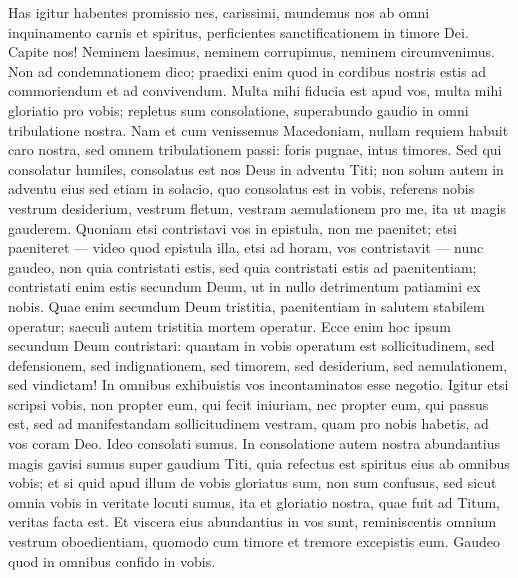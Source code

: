 \begin{biblechapter}  
\verse Has igitur habentes promissio nes, carissimi, mundemus nos ab omni inquinamento carnis et spiritus, perficientes sanctificationem in timore Dei. 
\verse Capite nos! Neminem laesimus, neminem corrupimus, neminem circumvenimus. 
\verse Non ad condemnationem dico; praedixi enim quod in cordibus nostris estis ad commoriendum et ad convivendum. 
\verse Multa mihi fiducia est apud vos, multa mihi gloriatio pro vobis; repletus sum consolatione, superabundo gaudio in omni tribulatione nostra. 
\verse Nam et cum venissemus Macedoniam, nullam requiem habuit caro nostra, sed omnem tribulationem passi: foris pugnae, intus timores. 
\verse Sed qui consolatur humiles, consolatus est nos Deus in adventu Titi; 
\verse non solum autem in adventu eius sed etiam in solacio, quo consolatus est in vobis, referens nobis vestrum desiderium, vestrum fletum, vestram aemulationem pro me, ita ut magis gauderem. 
\verse Quoniam etsi contristavi vos in epistula, non me paenitet; etsi paeniteret — video quod epistula illa, etsi ad horam, vos contristavit — 
\verse nunc gaudeo, non quia contristati estis, sed quia contristati estis ad paenitentiam; contristati enim estis secundum Deum, ut in nullo detrimentum patiamini ex nobis. 
\verse Quae enim secundum Deum tristitia, paenitentiam in salutem stabilem operatur; saeculi autem tristitia mortem operatur. 
\verse Ecce enim hoc ipsum secundum Deum contristari: quantam in vobis operatum est sollicitudinem, sed defensionem, sed indignationem, sed timorem, sed desiderium, sed aemulationem, sed vindictam! In omnibus exhibuistis vos incontaminatos esse negotio. 
\verse Igitur etsi scripsi vobis, non propter eum, qui fecit iniuriam, nec propter eum, qui passus est, sed ad manifestandam sollicitudinem vestram, quam pro nobis habetis, ad vos coram Deo. 
\verse Ideo consolati sumus. In consolatione autem nostra abundantius magis gavisi sumus super gaudium Titi, quia refectus est spiritus eius ab omnibus vobis; 
\verse et si quid apud illum de vobis gloriatus sum, non sum confusus, sed sicut omnia vobis in veritate locuti sumus, ita et gloriatio nostra, quae fuit ad Titum, veritas facta est.  
\verse Et viscera eius abundantius in vos sunt, reminiscentis omnium vestrum oboedientiam, quomodo cum timore et tremore excepistis eum. 
\verse Gaudeo quod in omnibus confido in vobis.  
\end{biblechapter}

